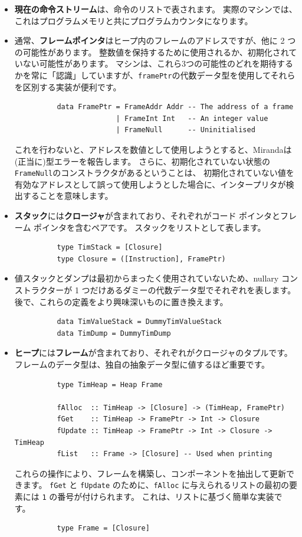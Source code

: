 \documentclass{jbook}
\begin{document}
\begin{itemize}
	\item \textbf{現在の命令ストリーム}は、命令のリストで表されます。
	      実際のマシンでは、これはプログラムメモリと共にプログラムカウンタになります。
	\item 通常、\textbf{フレームポインタ}はヒープ内のフレームのアドレスですが、他に 2 つの可能性があります。
	      整数値を保持するために使用されるか、初期化されていない可能性があります。
	      マシンは、これら3つの可能性のどれを期待するかを常に「認識」していますが、\texttt{framePtr}の代数データ型を使用してそれらを区別する実装が便利です。
	      \begin{verbatim}
          data FramePtr = FrameAddr Addr -- The address of a frame
                        | FrameInt Int   -- An integer value
                        | FrameNull      -- Uninitialised
        \end{verbatim}
	      これを行わないと、アドレスを数値として使用しようとすると、Mirandaは(正当に)型エラーを報告します。
	      さらに、初期化されていない状態の \texttt{FrameNull}のコンストラクタがあるということは、
	      初期化されていない値を有効なアドレスとして誤って使用しようとした場合に、インタープリタが検出することを意味します。
	\item \textbf{スタック}には\textbf{クロージャ}が含まれており、それぞれがコード ポインタとフレーム ポインタを含むペアです。
	      スタックをリストとして表します。
	      \begin{verbatim}
          type TimStack = [Closure]
          type Closure = ([Instruction], FramePtr)
        \end{verbatim}
	\item 値スタックとダンプは最初からまったく使用されていないため、nullary コンストラクターが 1 つだけあるダミーの代数データ型でそれぞれを表します。
	      後で、これらの定義をより興味深いものに置き換えます。
	      \begin{verbatim}
          data TimValueStack = DummyTimValueStack
          data TimDump = DummyTimDump
        \end{verbatim}
	\item \textbf{ヒープ}には\textbf{フレーム}が含まれており、それぞれがクロージャのタプルです。
	      フレームのデータ型は、独自の抽象データ型に値するほど重要です。
	      \begin{verbatim}
          type TimHeap = Heap Frame

          fAlloc  :: TimHeap -> [Closure] -> (TimHeap, FramePtr)
          fGet    :: TimHeap -> FramePtr -> Int -> Closure
          fUpdate :: TimHeap -> FramePtr -> Int -> Closure -> TimHeap
          fList   :: Frame -> [Closure] -- Used when printing
        \end{verbatim}
	      これらの操作により、フレームを構築し、コンポーネントを抽出して更新できます。
	      \texttt{fGet} と \texttt{fUpdate} のために、\texttt{fAlloc} に与えられるリストの最初の要素には \texttt{1} の番号が付けられます。
	      これは、リストに基づく簡単な実装です。
	      \begin{verbatim}
          type Frame = [Closure]


\end{verbatim}
\end{itemize}
\end{document}
